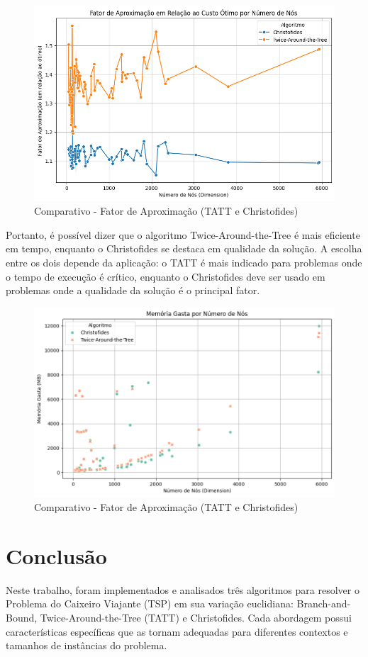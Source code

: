 \documentclass[12pt]{article}
\begin{document}
\begin{figure}[ht]
\centering
\includegraphics[width=.7\textwidth]{Figure4.png}
\caption{Comparativo - Fator de Aproximação (TATT e Christofides)}
\label{fig:exampleFig5}
\end{figure}

Portanto, é possível dizer que o algoritmo Twice-Around-the-Tree é mais eficiente em tempo, enquanto o Christofides se destaca em qualidade da solução. A escolha entre os dois depende da aplicação: o TATT é mais indicado para problemas onde o tempo de execução é crítico, enquanto o Christofides deve ser usado em problemas onde a qualidade da solução é o principal fator.

\begin{figure}[ht]
\centering
\includegraphics[width=.7\textwidth]{Figure5.png}
\caption{Comparativo - Fator de Aproximação (TATT e Christofides)}
\label{fig:exampleFig6}
\end{figure}

\section{Conclusão}

Neste trabalho, foram implementados e analisados três algoritmos para resolver o Problema do Caixeiro Viajante (TSP) em sua variação euclidiana: Branch-and-Bound, Twice-Around-the-Tree (TATT) e Christofides. Cada abordagem possui características específicas que as tornam adequadas para diferentes contextos e tamanhos de instâncias do problema.
\end{document}
